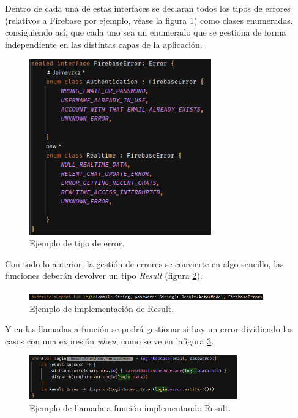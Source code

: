 Dentro de cada una de estas interfaces se declaran todos los tipos de errores (relativos a \hyperlink{subsec:firebase}{Firebase} por ejemplo, véase la figura \ref{fig:ejemplo_tipo_error}) como clases enumeradas, consiguiendo así, que cada uno sea un enumerado que se gestiona de forma independiente en las distintas capas de la aplicación.
\newpage
\begin{figure}[h]
    \centering
    \includegraphics[width = 0.7\textwidth]{Imagenes/Fuentes/ejemplo_tipo_error.png}
    \caption{Ejemplo de tipo de error.}
    \label{fig:ejemplo_tipo_error}
\end{figure}

Con todo lo anterior, la gestión de errores se convierte en algo sencillo, las funciones deberán devolver un tipo \textit{Result} (figura \ref{fig:ejemplo_impl_result}).
\begin{figure}[h]
    \centering
    \includegraphics[width = 0.9\textwidth]{Imagenes/Fuentes/ejemplo_impl_result.png}
    \caption{Ejemplo de implementación de Result.}
    \label{fig:ejemplo_impl_result}
\end{figure}

Y en las llamadas a función se podrá gestionar si hay un error dividiendo los casos con una expresión
\textit{when}\hyperlink{cap:biblio}{}, como se ve en lafigura \ref{fig:llamada_funcion_result}.
\begin{figure}[h]
    \centering
    \includegraphics[width = 0.8\textwidth]{Imagenes/Fuentes/llamada_funcion_result.png}
    \caption{Ejemplo de llamada a función implementando Result.}
    \label{fig:llamada_funcion_result}
\end{figure}